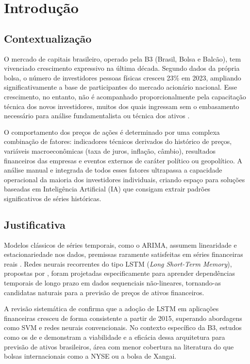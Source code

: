 \documentclass[12pt]{article}
\begin{document}
\section{Introdução}

\subsection{Contextualização}

O mercado de capitais brasileiro, operado pela B3 (Brasil, Bolsa e Balcão),
tem vivenciado crescimento expressivo na última década. Segundo dados da
própria bolsa, o número de investidores pessoas físicas cresceu 23\% em 2023,
ampliando significativamente a base de participantes do mercado acionário
nacional. Esse crescimento, no entanto, não é acompanhado proporcionalmente
pela capacitação técnica dos novos investidores, muitos dos quais ingressam
sem o embasamento necessário para análise fundamentalista ou técnica dos
ativos \cite{zanotto:2026}.

O comportamento dos preços de ações é determinado por uma complexa
combinação de fatores: indicadores técnicos derivados do histórico de preços,
variáveis macroeconômicas (taxa de juros, inflação, câmbio), resultados
financeiros das empresas e eventos externos de caráter político ou
geopolítico. A análise manual e integrada de todos esses fatores ultrapassa
a capacidade operacional da maioria dos investidores individuais, criando
espaço para soluções baseadas em Inteligência Artificial (IA) que consigam
extrair padrões significativos de séries históricas.

\subsection{Justificativa}

Modelos clássicos de séries temporais, como o ARIMA, assumem linearidade e
estacionariedade nos dados, premissas raramente satisfeitas em séries
financeiras reais \cite{box:1970}. Redes neurais recorrentes do tipo LSTM
(\textit{Long Short-Term Memory}), propostas por
\cite{hochreiter:1997}, foram projetadas especificamente para aprender dependências temporais
de longo prazo em dados sequenciais não-lineares, tornando-as candidatas
naturais para a previsão de preços de ativos financeiros.

A revisão sistemática de \cite{mintarya:2023} confirma que a adoção de
LSTM em aplicações financeiras cresceu de forma consistente a partir de 2015,
superando abordagens como SVM e redes neurais convencionais. No contexto
específico da B3, estudos como os de \cite{silveira:2021} e
\cite{zanotto:2026} demonstram a viabilidade e a eficácia dessa arquitetura
para previsão de ativos brasileiros, área com menor cobertura na literatura
do que bolsas internacionais como a NYSE ou a bolsa de Xangai.
\end{document}
